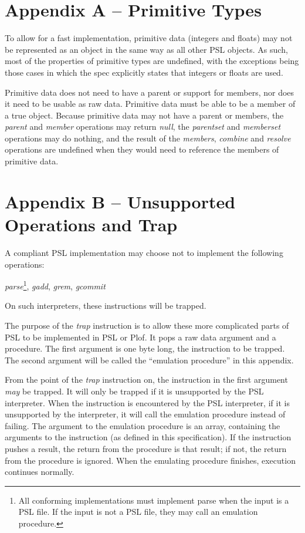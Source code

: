 \chapter{Appendix A -- Primitive Types}

To allow for a fast implementation, primitive data (integers and floats) may not be represented as an object in the same way as all other PSL objects. As such, most of the properties of primitive types are undefined, with the exceptions being those cases in which the spec explicitly states that integers or floats are used.

Primitive data does not need to have a parent or support for members, nor does it need to be usable as raw data. Primitive data must be able to be a member of a true object. Because primitive data may not have a parent or members, the \textit{parent} and \textit{member} operations may return \textit{null}, the \textit{parentset} and \textit{memberset} operations may do nothing, and the result of the \textit{members}, \textit{combine} and \textit{resolve} operations are undefined when they would need to reference the members of primitive data.



\chapter{Appendix B -- Unsupported Operations and Trap}

A compliant PSL implementation may choose not to implement the following operations:

\textit{parse}\footnote{All conforming implementations must implement parse when the input is a PSL file. If the input is not a PSL file, they may call an emulation procedure.}, \textit{gadd}, \textit{grem}, \textit{gcommit}

On such interpreters, these instructions will be trapped.

The purpose of the \textit{trap} instruction is to allow these more complicated parts of PSL to be implemented in PSL or Plof. It pops a raw data argument and a procedure. The first argument is one byte long, the instruction to be trapped. The second argument will be called the “emulation procedure” in this appendix.

From the point of the \textit{trap} instruction on, the instruction in the first argument \textit{may} be trapped. It will only be trapped if it is unsupported by the PSL interpreter. When the instruction is encountered by the PSL interpreter, if it is unsupported by the interpreter, it will call the emulation procedure instead of failing. The argument to the emulation procedure is an array, containing the arguments to the instruction (as defined in this specification). If the instruction pushes a result, the return from the procedure is that result; if not, the return from the procedure is ignored. When the emulating procedure finishes, execution continues normally.

